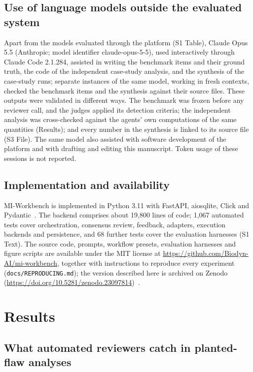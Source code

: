 \documentclass[10pt,letterpaper]{article}
\begin{document}
\subsection*{Use of language models outside the evaluated system}

Apart from the models evaluated through the platform (S1 Table), Claude Opus 5.5 (Anthropic; model identifier claude-opus-5-5), used interactively through Claude Code 2.1.284, assisted in writing the benchmark items and their ground truth, the code of the independent case-study analysis, and the synthesis of the case-study runs; separate instances of the same model, working in fresh contexts, checked the benchmark items and the synthesis against their source files. These outputs were validated in different ways. The benchmark was frozen before any reviewer call, and the judges applied its detection criteria; the independent analysis was cross-checked against the agents' own computations of the same quantities (Results); and every number in the synthesis is linked to its source file (S3 File). The same model also assisted with software development of the platform and with drafting and editing this manuscript. Token usage of these sessions is not reported.

\subsection*{Implementation and availability}

MI-Workbench is implemented in Python 3.11 with FastAPI, aiosqlite, Click and Pydantic~\cite{pydantic}. The backend comprises about 19,800 lines of code; 1,067 automated tests cover orchestration, consensus review, feedback, adapters, execution backends and persistence, and 68 further tests cover the evaluation harnesses (S1 Text). The source code, prompts, workflow presets, evaluation harnesses and figure scripts are available under the MIT license at \url{https://github.com/Biodyn-AI/mi-workbench}, together with instructions to reproduce every experiment (\texttt{docs/REPRODUCING.md}); the version described here is archived on Zenodo (\url{https://doi.org/10.5281/zenodo.23097814})~\cite{kendiukhov2026miworkbench}.


\section*{Results}

\subsection*{What automated reviewers catch in planted-flaw analyses}
\end{document}
